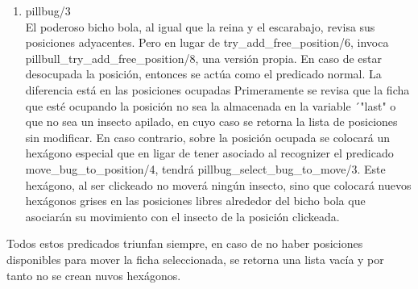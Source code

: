 \documentclass[a4paper,12pt]{article}
\begin{document}
\begin{enumerate}
\item pillbug/3\\
El poderoso bicho bola, al igual que la reina y el escarabajo, revisa sus posiciones adyacentes. Pero en lugar de try\_add\_free\_position/6, invoca pillbull\_try\_add\_free\_position/8, una versión propia. En caso de estar desocupada la posición, entonces se actúa como el predicado normal. La diferencia está en las posiciones ocupadas	Primeramente se revisa que la ficha que esté ocupando la posición no sea la almacenada en la variable ´"last" o que no sea un insecto apilado, en cuyo caso se retorna la lista de posiciones sin modificar. En caso contrario, sobre la posición ocupada se colocará un hexágono especial que en ligar de tener asociado al recognizer el predicado move\_bug\_to\_position/4, tendrá pillbug\_select\_bug\_to\_move/3. Este hexágono, al ser clickeado no moverá ningún insecto, sino que colocará nuevos hexágonos grises en las posiciones libres alrededor del bicho bola que asociarán su movimiento con el insecto de la posición clickeada.
\end{enumerate}

Todos estos predicados triunfan siempre, en caso de no haber posiciones disponibles para mover la ficha seleccionada, se retorna una lista vacía y por tanto no se crean nuvos hexágonos.
\end{document}
